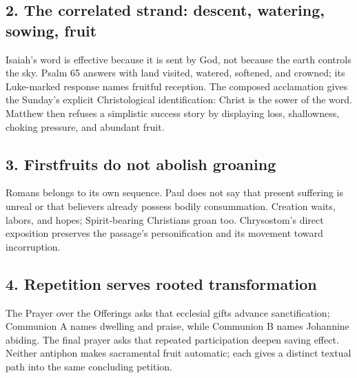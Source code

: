 \subsection*{2. The correlated strand: descent, watering, sowing, fruit\enspace{}}

Isaiah's word is effective because it is sent by God, not because the earth controls the sky. Psalm 65 answers with land visited, watered, softened, and crowned; its Luke-marked response names fruitful reception. The composed acclamation gives the Sunday's explicit Christological identification: Christ is the sower of the word. Matthew then refuses a simplistic success story by displaying loss, shallowness, choking pressure, and abundant fruit.

\subsection*{3. Firstfruits do not abolish groaning\enspace{}}

Romans belongs to its own sequence. Paul does not say that present suffering is unreal or that believers already possess bodily consummation. Creation waits, labors, and hopes; Spirit-bearing Christians groan too. Chrysostom's direct exposition preserves the passage's personification and its movement toward incorruption.

\subsection*{4. Repetition serves rooted transformation\enspace{}}

The Prayer over the Offerings asks that ecclesial gifts advance sanctification; Communion A names dwelling and praise, while Communion B names Johannine abiding. The final prayer asks that repeated participation deepen saving effect. Neither antiphon makes sacramental fruit automatic; each gives a distinct textual path into the same concluding petition.
